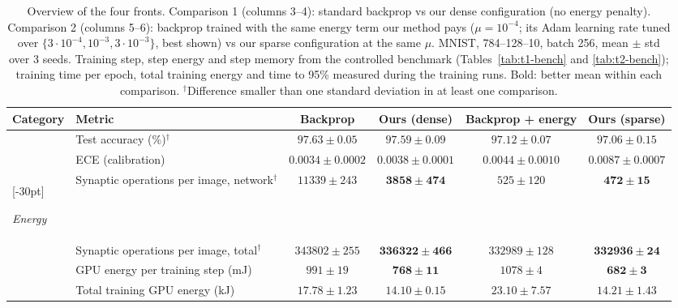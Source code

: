 
\begin{table}[H]
\centering
\small
\setlength{\tabcolsep}{4pt}
\caption{Overview of the four fronts. Comparison 1 (columns 3--4): standard backprop vs our dense configuration (no energy penalty). Comparison 2 (columns 5--6): backprop trained with the same energy term our method pays ($\mu = 10^{-4}$; its Adam learning rate tuned over $\{3\cdot10^{-4}, 10^{-3}, 3\cdot10^{-3}\}$, best shown) vs our sparse configuration at the same $\mu$. MNIST, 784--128--10, batch 256, mean $\pm$ std over 3 seeds. Training step, step energy and step memory from the controlled benchmark (Tables~\ref{tab:t1-bench} and \ref{tab:t2-bench}); training time per epoch, total training energy and time to 95\% measured during the training runs. Bold: better mean within each comparison. $^\dagger$Difference smaller than one standard deviation in at least one comparison.}
\label{tab:overview}
\begin{tabular}{>{\raggedright\arraybackslash}p{2.1cm}>{\raggedright\arraybackslash}p{3.5cm}cccc}
\toprule
Category & Metric & Backprop & Ours (dense) & Backprop + energy & Ours (sparse) \\
\midrule
\multirow{2}{*}{\parbox[c]{2.1cm}{\raggedright\textit{Accuracy}}} & Test accuracy (\%)$^\dagger$ & $\boldsymbol{97.63 \pm 0.05}$ & $97.59 \pm 0.09$ & $\boldsymbol{97.12 \pm 0.07}$ & $97.06 \pm 0.15$ \\
 & ECE (calibration) & $\boldsymbol{0.0034 \pm 0.0002}$ & $0.0038 \pm 0.0001$ & $\boldsymbol{0.0044 \pm 0.0010}$ & $0.0087 \pm 0.0007$ \\
\midrule
\multirow{5}{*}[-30pt]{\parbox[c]{2.1cm}{\raggedright\textit{Energy}}} & Synaptic operations per image, network$^\dagger$ & $11339 \pm 243$ & $\boldsymbol{3858 \pm 474}$ & $525 \pm 120$ & $\boldsymbol{472 \pm 15}$ \\
 & Synaptic operations per image, total$^\dagger$ & $343802 \pm 255$ & $\boldsymbol{336322 \pm 466}$ & $332989 \pm 128$ & $\boldsymbol{332936 \pm 24}$ \\
 & GPU energy per training step (mJ) & $991 \pm 19$ & $\boldsymbol{768 \pm 11}$ & $1078 \pm 4$ & $\boldsymbol{682 \pm 3}$ \\
 & Total training GPU energy (kJ) & $17.78 \pm 1.23$ & $\boldsymbol{14.10 \pm 0.15}$ & $23.10 \pm 7.57$ & $\boldsymbol{14.21 \pm 1.43}$ \\

\end{tabular}
\end{table}
